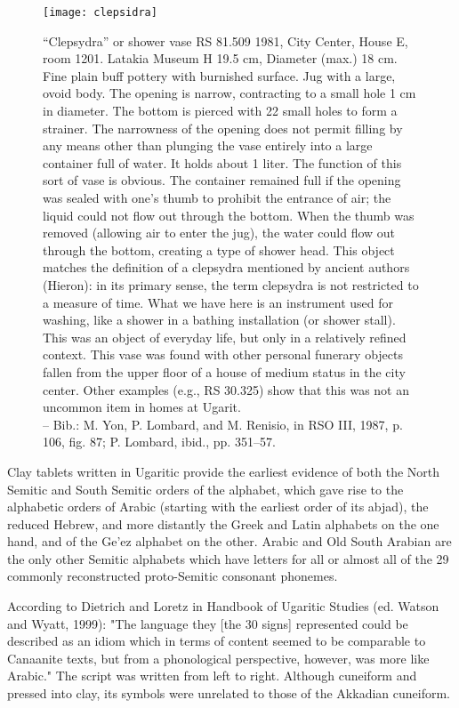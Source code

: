 \begin{figure}[htbp]
\texttt{[image: clepsidra]}
\caption{“Clepsydra” or shower vase RS 81.509
1981, City Center, House E, room 1201. Latakia Museum
H 19.5 cm, Diameter (max.) 18 cm. Fine plain buff pottery with burnished surface. Jug with a large,
ovoid body. The opening is narrow, contracting to a small hole 1 cm in diameter. The bottom is
pierced with 22 small holes to form a strainer. The narrowness of the opening does not permit filling
by any means other than plunging the vase entirely into a large container full of water. It holds about
1 liter. The function of this sort of vase is obvious. The container remained full if the opening was
sealed with one’s thumb to prohibit the entrance of air; the liquid could not flow out through the
bottom. When the thumb was removed (allowing air to enter the jug), the water could flow out
through the bottom, creating a type of shower head.
This object matches the definition of a clepsydra mentioned by ancient authors (Hieron): in its
primary sense, the term clepsydra is not restricted to a measure of time. What we have here is an instrument
used for washing, like a shower in a bathing installation (or shower stall). This was an object
of everyday life, but only in a relatively refined context. This vase was found with other personal
funerary objects fallen from the upper floor of a house of medium status in the city center. Other examples
(e.g., RS 30.325) show that this was not an uncommon item in homes at Ugarit.\\
– Bib.: M. Yon, P. Lombard, and M. Renisio, in RSO III, 1987, p. 106, fig. 87; P. Lombard, ibid., pp. 351–57.}
\label{fig:clepsidra}
\end{figure}

Clay tablets written in Ugaritic provide the earliest evidence of both the North Semitic and South Semitic orders of the alphabet, which gave rise to the alphabetic orders of Arabic (starting with the earliest order of its abjad), the reduced Hebrew, and more distantly the Greek and Latin alphabets on the one hand, and of the Ge'ez alphabet on the other. Arabic and Old South Arabian are the only other Semitic alphabets which have letters for all or almost all of the 29 commonly reconstructed proto-Semitic consonant phonemes. 

According to Dietrich and Loretz in Handbook of Ugaritic Studies (ed. Watson and Wyatt, 1999): "The language they [the 30 signs] represented could be described as an idiom which in terms of content seemed to be comparable to Canaanite texts, but from a phonological perspective, however, was more like Arabic."
The script was written from left to right. Although cuneiform and pressed into clay, its symbols were unrelated to those of the Akkadian cuneiform.

